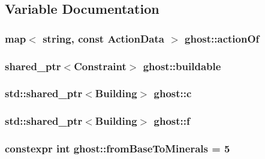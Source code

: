 \subsection{Variable Documentation}
\hypertarget{namespaceghost_a39cb7cc32473e2ea03f0192af2c832fc}{
\subsubsection[{action\-Of}]{\setlength{\rightskip}{0pt plus 5cm}map$<$ string, const {\bf Action\-Data} $>$ ghost\-::action\-Of}}\label{namespaceghost_a39cb7cc32473e2ea03f0192af2c832fc}
\hypertarget{namespaceghost_aed6c0dcd76842d41ca1a81a6b4301247}{
\subsubsection[{buildable}]{\setlength{\rightskip}{0pt plus 5cm}shared\-\_\-ptr$<${\bf Constraint}$>$ ghost\-::buildable}}\label{namespaceghost_aed6c0dcd76842d41ca1a81a6b4301247}
\hypertarget{namespaceghost_a1e04a626798fce7a46db973e9693354e}{
\subsubsection[{c}]{\setlength{\rightskip}{0pt plus 5cm}std\-::shared\-\_\-ptr$<${\bf Building}$>$ ghost\-::c}}\label{namespaceghost_a1e04a626798fce7a46db973e9693354e}
\hypertarget{namespaceghost_a79c82e0d4f18942474a997e6421358f4}{
\subsubsection[{f}]{\setlength{\rightskip}{0pt plus 5cm}std\-::shared\-\_\-ptr$<${\bf Building}$>$ ghost\-::f}}\label{namespaceghost_a79c82e0d4f18942474a997e6421358f4}
\hypertarget{namespaceghost_aef53554d2400a44d3f13b5d10da5dc60}{
\subsubsection[{from\-Base\-To\-Minerals}]{\setlength{\rightskip}{0pt plus 5cm}constexpr int ghost\-::from\-Base\-To\-Minerals = 5}}\label{namespaceghost_aef53554d2400a44d3f13b5d10da5dc60}
